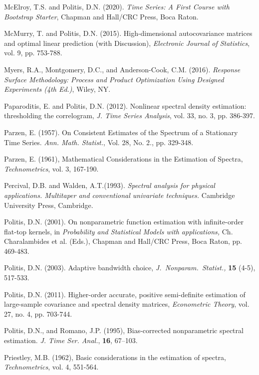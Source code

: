 \documentclass[12p E.Lt,psfig]{article} %
\begin{document}
\begin{thebibliography}{999}
\bibitem{}   McElroy, T.S. and   Politis, D.N. (2020).
{\it Time Series: A First Course with Bootstrap Starter}, Chapman and Hall/CRC Press,
Boca Raton.


\bibitem{} McMurry, T. and Politis, D.N. (2015).  High-dimensional autocovariance matrices and optimal linear prediction (with Discussion), {\it Electronic Journal of Statistics}, vol. 9, pp. 753-788.

\bibitem{}  Myers, R.A.,   Montgomery, D.C.,  and  Anderson-Cook, C.M. (2016).
{\it Response Surface Methodology: Process and Product Optimization Using Designed Experiments  (4th Ed.)}, Wiley, NY.
  

 \bibitem{} Paparoditis, E. and    Politis, D.N. (2012).
Nonlinear spectral density estimation: thresholding the correlogram,
{\it  J. Time Series Analysis}, vol. 33, no. 3, pp. 386-397.


\bibitem{} Parzen, E. (1957).
On Consistent Estimates of the Spectrum of a Stationary Time Series.
{\it Ann. Math. Statist.}, Vol. 28, No. 2., pp. 329-348.


 Parzen, E. (1961),  Mathematical Considerations in the Estimation
of Spectra, {\it Technometrics}, vol. 3,  167-190.

 \bibitem{} Percival, D.B. and Walden, A.T.(1993).
{\it  Spectral analysis for physical applications. Multitaper and conventional univariate techniques.} Cambridge University Press, Cambridge.



   Politis, D.N. (2001). On nonparametric function estimation
 with infinite-order flat-top kernels, in {\it
Probability and Statistical Models with applications,} Ch. Charalambides et al. (Eds.), Chapman and Hall/CRC
Press,       Boca Raton,   pp. 469-483.

 Politis, D.N. (2003). Adaptive bandwidth choice,
{\it J.~Nonparam.~Statist.,}  {\bf 15} (4-5), 517-533.


 Politis, D.N. (2011).
Higher-order accurate, positive semi-definite  estimation
 of large-sample  covariance and spectral density matrices,
 {\it Econometric Theory}, vol. 27, no. 4, pp. 703-744.

  Politis, D.N., and Romano, J.P. (1995),
  Bias-corrected nonparametric
spectral estimation. {\it J. Time Ser. Anal.}, {\bf 16}, 67--103.



 Priestley, M.B.  (1962),  Basic considerations in the
estimation of spectra, {\it Technometrics}, vol. 4, 551-564.


\end{thebibliography}
\end{document}
